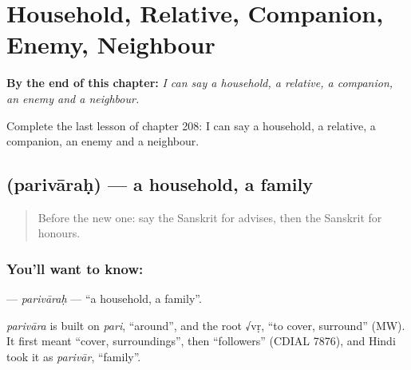 
\chapter{Household, Relative, Companion, Enemy, Neighbour}
\label{ch:sa-household-relative-companion-enemy-neighbour}

\begin{chapteropening}
\textbf{By the end of this chapter:} \emph{I can say a household, a relative, a companion, an enemy and a neighbour.}

Complete the last lesson of chapter 208: I can say a household, a relative, a companion, an enemy and a neighbour.
\end{chapteropening}

\section[\texorpdfstring{\sk{परिवारः} (parivāraḥ)}{परिवारः (parivāraḥ)}]{ (parivāraḥ) — a household, a family}

\label{lesson:SA-C208-parivarah}



\begin{quote}
Before the new one: say the Sanskrit for advises, then the Sanskrit for honours.
\end{quote}

\subsection*{You'll want to know: }
\textbf{} — \emph{parivāraḥ} — \textquotedblleft{}a household, a family\textquotedblright{}.

\begin{cousinweb}
\emph{parivāra} is built on \emph{pari}, \textquotedblleft{}around\textquotedblright{}, and the root √vṛ, \textquotedblleft{}to cover, surround\textquotedblright{} (MW). It first meant \textquotedblleft{}cover, surroundings\textquotedblright{}, then \textquotedblleft{}followers\textquotedblright{} (CDIAL 7876), and Hindi took it as \emph{parivār}, \textquotedblleft{}family\textquotedblright{}.
\end{cousinweb}

